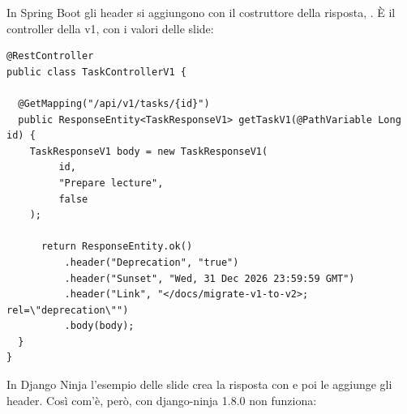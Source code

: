 In Spring Boot gli header si aggiungono con il costruttore della risposta,
. È il controller della v1, con i valori delle slide:

\begin{affianco}[0.6]
\codicepiccolo
\begin{lstlisting}[style=java, name=TaskControllerV1.java]
@RestController
public class TaskControllerV1 {

  @GetMapping("/api/v1/tasks/{id}")
  public ResponseEntity<TaskResponseV1> getTaskV1(@PathVariable Long id) {
    TaskResponseV1 body = new TaskResponseV1(
         id,
         "Prepare lecture",
         false
    );

      return ResponseEntity.ok()
          .header("Deprecation", "true")
          .header("Sunset", "Wed, 31 Dec 2026 23:59:59 GMT")
          .header("Link", "</docs/migrate-v1-to-v2>; rel=\"deprecation\"")
          .body(body);
  }
}
\end{lstlisting}
\risultato
{}
\end{affianco}

In Django Ninja l'esempio delle slide crea la risposta con
 e poi le aggiunge gli header. Così com'è, però,
con django-ninja 1.8.0 non funziona:

